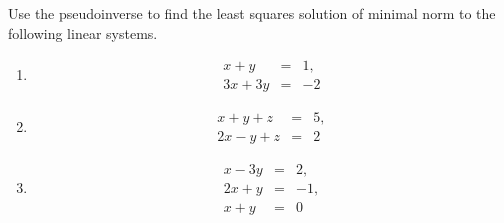 \documentclass[10pt]{extarticle}
\begin{document}
\newpage

\begin{problem}[Problem 6]
Use the pseudoinverse to find the least squares solution of minimal norm to the following linear systems.
\begin{enumerate}[label=(\alph*)]
\item
\[
\begin{array}{rcl}
x+y & = & 1,\\
3x+3y & = & -2
\end{array}
\]
\item
\[
\begin{array}{rcl}
x+y+z & = & 5,\\
2x-y+z & = & 2
\end{array}
\]
\item
\[
\begin{array}{rcl}
x-3y & = & 2,\\
2x+y & = & -1,\\
x+y & = & 0
\end{array}
\]
\end{enumerate}
\end{problem}
\end{document}
